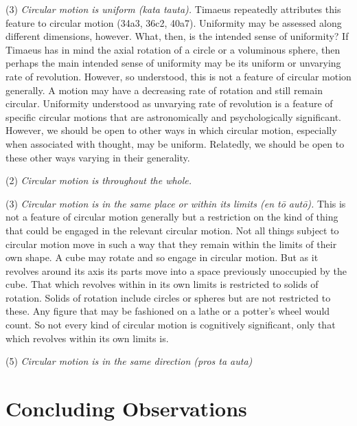 (3) \emph{Circular motion is uniform (\emph{kata tauta}).} Timaeus repeatedly attributes this feature to circular motion (34a3, 36c2, 40a7). Uniformity may be assessed along different dimensions, however. What, then, is the intended sense of uniformity? If Timaeus has in mind the axial rotation of a circle or a voluminous sphere, then perhaps the main intended sense of uniformity may be its uniform or unvarying rate of revolution. However, so understood, this is not a feature of circular motion generally. A motion may have a decreasing rate of rotation and still remain circular. Uniformity understood as unvarying rate of revolution is a feature of specific circular motions that are astronomically and psychologically significant. However, we should be open to other ways in which circular motion, especially when associated with thought, may be uniform. Relatedly, we should be open to these other ways varying in their generality.

(2) \emph{Circular motion is throughout the whole.}

(3) \emph{Circular motion is in the same place or within its limits (\emph{en tō autō}).} This is not a feature of circular motion generally but a restriction on the kind of thing that could be engaged in the relevant circular motion. Not all things subject to circular motion move in such a way that they remain within the limits of their own shape. A cube may rotate and so engage in circular motion. But as it revolves around its axis its parts move into a space previously unoccupied by the cube. That which revolves within in its own limits is restricted to solids of rotation. Solids of rotation include circles or spheres but are not restricted to these. Any figure that may be fashioned on a lathe or a potter's wheel would count. So not every kind of circular motion is cognitively significant, only that which revolves within its own limits is.



(5) \emph{Circular motion is in the same direction (\emph{pros ta auta})}


\section{Concluding Observations} %
\label{sec:concluding_observations_cr}





